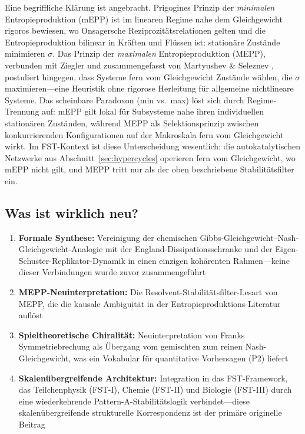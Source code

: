 \documentclass[12pt,a4paper]{article}
\theoremstyle{remark}
\begin{document}
\noindent
Eine begriffliche Kl\"arung ist angebracht. Prigogines Prinzip der \emph{minimalen} Entropieproduktion (mEPP) \citep{Prigogine1947} ist im linearen Regime nahe dem Gleichgewicht rigoros bewiesen, wo Onsagersche Reziprozit\"atsrelationen gelten und die Entropieproduktion bilinear in Kr\"aften und Fl\"ussen ist: station\"are Zust\"ande minimieren $\sigma$. Das Prinzip der \emph{maximalen} Entropieproduktion (MEPP), verbunden mit Ziegler \citep{Ziegler1963} und zusammengefasst von Martyushev \& Seleznev \citep{MEPP2006}, postuliert hingegen, dass Systeme fern vom Gleichgewicht Zust\"ande w\"ahlen, die $\sigma$ maximieren---eine Heuristik ohne rigorose Herleitung f\"ur allgemeine nichtlineare Systeme. Das scheinbare Paradoxon (min vs.\ max) l\"ost sich durch Regime-Trennung auf: mEPP gilt lokal f\"ur Subsysteme nahe ihren individuellen station\"aren Zust\"anden, w\"ahrend MEPP als Selektionsprinzip zwischen konkurrierenden Konfigurationen auf der Makroskala fern vom Gleichgewicht wirkt. Im FST-Kontext ist diese Unterscheidung wesentlich: die autokatalytischen Netzwerke aus Abschnitt~\ref{sec:hypercycles} operieren fern vom Gleichgewicht, wo mEPP nicht gilt, und MEPP tritt nur als der oben beschriebene Stabilit\"atsfilter ein.

\subsection{Was ist wirklich neu?}

\begin{enumerate}
    \item \textbf{Formale Synthese:} Vereinigung der chemischen Gibbs-Gleichgewicht--Nash-Gleichgewicht-Analogie \citep{MetabolicNash} mit der England-Dissipationsschranke \citep{England2013} und der Eigen-Schuster-Replikator-Dynamik \citep{Eigen1979} in einen einzigen koh\"arenten Rahmen---keine dieser Verbindungen wurde zuvor zusammengef\"uhrt
    \item \textbf{MEPP-Neuinterpretation:} Die Resolvent-Stabilit\"atsfilter-Lesart von MEPP, die die kausale Ambiguit\"at in der Entropieproduktions-Literatur aufl\"ost
    \item \textbf{Spieltheoretische Chiralit\"at:} Neuinterpretation von Franks Symmetriebrechung \citep{Frank1953} als \"Ubergang vom gemischten zum reinen Nash-Gleichgewicht, was ein Vokabular f\"ur quantitative Vorhersagen (P2) liefert
    \item \textbf{Skalen\"ubergreifende Architektur:} Integration in das FST-Framework, das Teilchenphysik (FST-I), Chemie (FST-II) und Biologie (FST-III) durch eine wiederkehrende Pattern-A-Stabilit\"atslogik verbindet---diese skalen\"ubergreifende strukturelle Korrespondenz ist der prim\"are originelle Beitrag
\end{enumerate}
\end{document}
